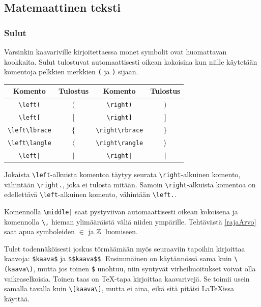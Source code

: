 \subsection{Matemaattinen teksti}
\begin{frame}[fragile]
    \frametitle{Sulut}
    Varsinkin kaavariville kirjoitettaessa monet symbolit ovat huomattavan kookkaita. Sulut tulostuvat automaattisesti oikean kokoisina kun niille käytetään komentoja pelkkien merkkien \verb-(- ja \verb-)- sijaan. \vaihto
    \begin{tabular}{cc|cc}
        Komento & Tulostus & Komento & Tulostus\\
        \hline
        \verb-\left(- & \(\left(\right.\) & \verb-\right)-& \(\left.\right)\)\\
        \verb-\left[- & \(\left[\right.\) & \verb-\right]-& \(\left.\right]\)\\
        \verb-\left\lbrace- & \(\left\lbrace\right.\) & \verb-\right\rbrace- & \(\left.\right\rbrace\)\\
        \verb-\left\langle- & \(\left\langle\right.\) & \verb-\right\rangle- & \(\left.\right\rangle\)\\
        \verb-\left|- & \(\left|\right.\) & \verb-\right|- & \(\left.\right|\)\\
    \end{tabular}
    \vaihto
    Jokaista \verb-\left--alkuista komentoa täytyy seurata \verb-\right--alkuinen komento, vähintään \verb-\right.-, joka ei tulosta mitään. Samoin \verb-\right--alkuista komentoa on edellettävä \verb-\left--alkuinen komento, vähintään \verb-\left.-. 
\end{frame}
\begin{frame}[fragile]
    
    Komennolla \verb-\middle|- saat pystyviivan automaattisesti oikean kokoisena ja komennolla \verb-\,- hieman ylimääräistä väliä niiden ympärille. Tehtävästä \ref{rajaArvo} saat apua symboleiden \(\in\) ja \(\mathbb{Z}\,\) luomiseen.
\end{frame}
\begin{frame}[fragile]
    
    \begin{extra}
        \begin{scriptsize}
            Tulet todennäköisesti joskus törmäämään myös seuraaviin tapoihin kirjoittaa kaavoja: \verb-$kaava$- ja \verb-$$kaava$$-. Ensimmäinen on käytännössä sama kuin \verb-\(kaava\)-, mutta jos toinen \verb-$- unohtuu, niin syntyvät virheilmoitukset voivat olla vaikeaselkoisia. Toinen taas on \TeX -tapa kirjoittaa kaavarivejä. Se toimii usein samalla tavalla kuin \verb-\[kaava\]-, mutta ei aina, eikä sitä pitäisi \LaTeX issa käyttää.
        \end{scriptsize}
    \end{extra}
\end{frame}
